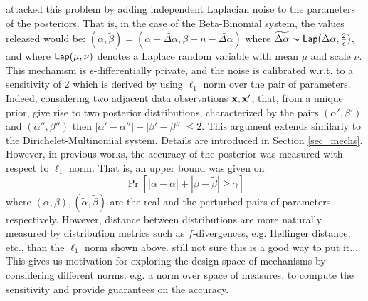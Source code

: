 \documentclass{article}
\begin{document}
attacked this problem by adding independent Laplacian noise to the
parameters of the posteriors. That is, in the case of the Beta-Binomial system,
the values released would be: $(\tilde\alpha,\tilde\beta)=(\alpha +  \widetilde{\Delta \alpha},\beta + n - \widetilde{\Delta \alpha})$
where $\widetilde{\Delta \alpha}\thicksim \mathsf{Lap}(\Delta \alpha, \frac{2}{\epsilon})$,
and where $\mathsf{Lap}(\mu, \nu)$ denotes a Laplace random variable with mean $\mu$ and scale $\nu$.
This mechanism is $\epsilon$-differentially private, and the noise is
calibrated w.r.t. to a sensitivity of 2 which is derived by using
$\ell_1$ norm over the pair of parameters. Indeed, considering two
adjacent data observations $\textbf{x}, \textbf{x}'$, that, from a unique prior, give rise to two posterior
distributions, characterized by the pairs
$(\alpha',\beta')$ and $(\alpha'',\beta'')$ then
$|\alpha'-\alpha''|+|\beta'-\beta''|\leq 2$.
This argument extends similarly to the Dirichelet-Multinomial system. Details are introduced in Section \ref{sec_mechs}.\\
However, in previous works, the accuracy of the posterior was measured with respect to $\ell_1$ norm. That is, an upper bound was given on
\[
  \Pr[|\alpha - \tilde\alpha| + |\beta - \tilde\beta |\geq \gamma ]
\]
where $(\alpha, \beta), (\tilde\alpha,\tilde\beta)$ are the real and the perturbed pairs of parameters, respectively.
However, distance between
distributions are more naturally  measured by distribution
metrics such as $f$-divergences, e.g. Hellinger distance, etc., than the $\ell_1$ norm shown above.
{\color{blue} still not sure this is a good way to put it...}
This gives us motivation for exploring the design space
of mechanisms by considering different norms. e.g. a norm over space of measures.
to compute the sensitivity and provide guarantees on the accuracy.
\end{document}
